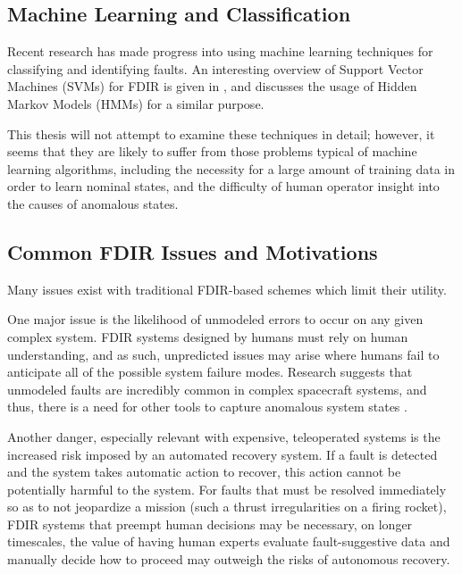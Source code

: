 \subsection{Machine Learning and Classification}

Recent research has made progress into using machine learning techniques for classifying and identifying faults. An interesting overview of Support Vector Machines (SVMs) for FDIR is given in \cite{lin2006fault}, and \cite{aycard2000state} discusses the usage of Hidden Markov Models (HMMs) for a similar purpose.

This thesis will not attempt to examine these techniques in detail; however, it seems that they are likely to suffer from those problems typical of machine learning algorithms, including the necessity for a large amount of training data in order to learn nominal states, and the difficulty of human operator insight into the causes of anomalous states.



\subsection{Common FDIR Issues and Motivations}

Many issues exist with traditional FDIR-based schemes which limit their utility.

One major issue is the likelihood of unmodeled errors to occur on any given complex system. FDIR systems designed by humans must rely on human understanding, and as such, unpredicted issues may arise where humans fail to anticipate all of the possible system failure modes. Research suggests that unmodeled faults are incredibly common in complex spacecraft systems, and thus, there is a need for other tools to capture anomalous system states \cite{kurien2010intrinsic}.

Another danger, especially relevant with expensive, teleoperated systems is the increased risk imposed by an automated recovery system. If a fault is detected and the system takes automatic action to recover, this action cannot be potentially harmful to the system. For faults that must be resolved immediately so as to not jeopardize a mission (such a thrust irregularities on a firing rocket), FDIR systems that preempt human decisions may be necessary, on longer timescales, the value of having human experts evaluate fault-suggestive data and manually decide how to proceed may outweigh the risks of autonomous recovery.

